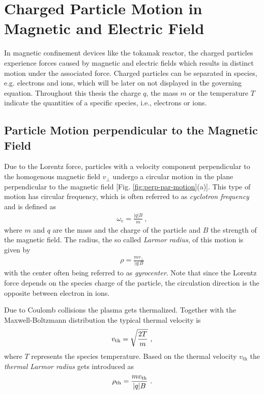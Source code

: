 \section{Charged Particle Motion in Magnetic and Electric Field}
\label{sec:motion}

In magnetic confinement devices like the tokamak reactor, the charged particles experience forces caused by magnetic and electric fields which results in distinct motion under the associated force. Charged particles can be separated in species, e.g. electrons and ions, which will be later on not displayed in the governing equation. Throughout this thesis the charge $q$, the mass $m$ or the temperature $T$ indicate the quantities of a specific species, i.e., electrons or ions.

\subsection{Particle Motion perpendicular to the Magnetic Field}
\label{sub:gyromotion}

Due to the Lorentz force, particles with a velocity component perpendicular to the homogenous magnetic field $v_{\perp}$ undergo a circular motion in the plane perpendicular to the magnetic field [Fig. \ref{fig:perp-par-motion}(a)]. This type of motion has circular frequency, which is often referred to as \textit{cyclotron frequency} and is defined as
\begin{gather}
    \omega_\mathrm{c} = \frac{|q|B}{m}~,
    \label{eq:cyclotron}
\end{gather}
where $m$ and $q$ are the mass and the charge of the particle and $B$ the strength of the magnetic field. The radius, the so called \textit{Larmor radius}, of this motion is given by
\begin{gather}
    \rho = \frac{mv_{\perp}}{|q|B}
    \label{eq:Larmorradius}
\end{gather}
with the center often being referred to as \textit{gyrocenter}. Note that since the Lorentz force depends on the species charge of the particle, the circulation direction is the opposite between electron in ions.\\\bigskip

Due to Coulomb collisions the plasma gets thermalized. Together with the Maxwell-Boltzmann distribution the typical thermal velocity is
\begin{gather}
    v_\mathrm{th} = \sqrt{\frac{2T}{m}}~,
    \label{eq:thermalVelocity}
\end{gather}
where $T$ represents the species temperature. Based on the thermal velocity $v_\mathrm{th}$ the \textit{thermal Larmor radius} gets introduced as \cite{Wesson2011}
\begin{gather}
    \rho_{\mathrm{th}} = \frac{mv_\mathrm{th}}{|q|B}~.
    \label{eq:thermalLarmorradius}
\end{gather}

